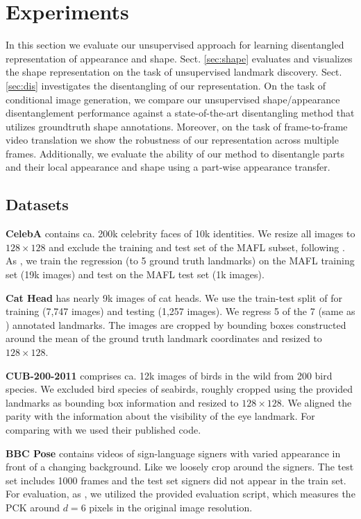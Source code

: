 \section{Experiments}
	In this section we evaluate our unsupervised approach for learning disentangled representation of appearance and shape.
	Sect. \ref{sec:shape} evaluates and visualizes the shape representation on the task of unsupervised landmark discovery.
	Sect. \ref{sec:dis} investigates the disentangling of our representation.
	On the task of conditional image generation, we compare our unsupervised shape/appearance disentanglement performance against a state-of-the-art disentangling method that utilizes groundtruth shape annotations.
	Moreover, on the task of frame-to-frame video translation we show the robustness of our representation across multiple frames.
	Additionally, we evaluate the ability of our method to disentangle parts and their local appearance and shape using a part-wise appearance transfer.

\subsection{Datasets}
    
	\textbf{CelebA} \cite{Liu:2015vj} contains ca. 200k celebrity faces of 10k identities.
	We resize all images to $128\times 128$ and exclude the training and test set of the MAFL subset, following \cite{Thewlis:2017wi}.
	As  \cite{Thewlis:2017wi, Zhang:2018vz}, we train the regression (to 5 ground truth landmarks) on the MAFL training set (19k images) and test on the MAFL test set (1k images).

	\textbf{Cat Head} \cite{Zhang:2008uj}  has nearly 9k images of cat heads.
	We use the train-test split of \cite{Zhang:2018vz} for training (7,747 images) and testing (1,257 images).
	We regress 5 of the 7 (same as \cite{Zhang:2018vz}) annotated landmarks.
	The images are cropped by bounding boxes constructed around the mean of the ground truth landmark coordinates and resized to $128\times128$.


	\textbf{CUB-200-2011} \cite{Wah:2011vq} comprises ca. 12k images of birds in the wild from 200 bird species.
	We excluded bird species of seabirds, roughly cropped using the provided landmarks as bounding box information and resized to $128\times128$.
	We aligned the parity with the information about the visibility of the eye landmark.
	For comparing with \cite{Zhang:2018vz} we used their published code.


	\textbf{BBC Pose} \cite{Charles:2013tb} contains videos of sign-language signers with varied appearance in front of a changing background. Like \cite{Jakab:2018wc} we loosely crop around the signers.
	The test set includes 1000 frames and the test set signers did not appear in the train set.
	For evaluation, as \cite{Jakab:2018wc}, we utilized the provided evaluation script, which measures the PCK around $d=6$ pixels in the original image resolution.


